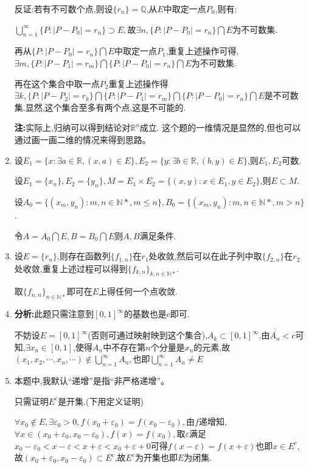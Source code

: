\documentclass[UTF8, a4paper, 12pt, oneside, onecolumn]{article}
\numberwithin{equation}{section}
\numberwithin{figure}{section}
\numberwithin{table}{section}
\theoremstyle{nonumberplain}	%
\theoremstyle{plain}	%
\theoremstyle{plain}	%
\theoremstyle{plain}	%
\theoremstyle{plain}	%
\theoremstyle{nonumberplain}
\begin{document}
\begin{enumerate}
	反证:若有不可数个点,则设$\{r_n\}=\mathbb{Q}$,从$E$中取定一点$P_0$,则有:
	
	$\displaystyle\bigcup_{n=1}^{\infty}\{P:|P-P_0|=r_n\}\supset E,$故$\exists n, \{P:|P-P_0|=r_n\}\bigcap E$为不可数集.
	
	再从$\{P:|P-P_0|=r_n\}\bigcap E$中取定一点$P_1$,重复上述操作可得,$\exists m,\{P:|P-P_1|=r_m\}\bigcap\{P:|P-P_0|=r_n\}\bigcap E$为不可数集.
	
	再在这个集合中取一点$P_2$重复上述操作得$\exists k,\{P:|P-P_2|=r_k\}\bigcap\{P:|P-P_1|=r_m\}\bigcap\{P:|P-P_0|=r_n\}\bigcap E$是不可数集.显然,这个集合至多有两个点,这是不可能的.
	
	\textbf{注:}实际上,归纳可以得到结论对$\mathbb{R}^n$成立. 这个题的一维情况是显然的,但也可以通过画一画二维的情况来得到思路。
	\item %
	设$E_1=\{x:\exists a\in\mathbb{R},(x,a)\in E\},E_2=\{y:\exists b\in\mathbb{R},(b,y)\in E\}$,则$E_1,E_2$可数.
	
	设$E_1=\{x_n\},E_2=\{y_n\},M=E_1\times E_2=\{(x,y):x\in E_1,y\in E_2\} $,则$E\subset M$.
	
	设$A_0=\{(x_m,y_n):m,n\in \mathbb{N*},m\leqslant n\},B_0=\{(x_m,y_n):m,n\in \mathbb{N*},m > n\}$.
	
	令$A=A_0\bigcap E,B=B_0\bigcap E$则$A,B$满足条件.
	\item 设$\displaystyle E=\{r_n\}$,则存在函数列$\displaystyle\{f_{1,n}\}$在$r_1$处收敛,然后可以在此子列中取$\displaystyle\{f_{2,n}\}$在$r_2$处收敛,重复上述过程可以得到$\displaystyle\{f_{k,n}\}_{k,n\in\mathbb{N*}}$.
	
	取$\displaystyle\{f_{n,n}\}_{n\in\mathbb{N*}}$即可在$E$上得任何一个点收敛.
	
	\item \textbf{分析:}此题只需注意到$[0,1]^{\infty}$的基数也是$c$即可.
	
	不妨设$E=[0,1]^{\infty}$(否则可通过映射映到这个集合),$A_k\subset [0,1]^{\infty}$.由$\displaystyle\overline{\overline{A_n}}<c$可知,$\exists x_n\in [0,1]$,$  $使得$A_n$中不存在第$n$个分量是$x_n$的元素,故$\displaystyle(x_1,x_2,\cdots,x_n,\cdots)\notin \bigcup_{n=1}^{\infty}A_n,$也即$\displaystyle\bigcup_{n=1}^{\infty}A_n\neq E$
	
	\item 本题中,我默认“递增”是指“非严格递增”。
	
	只需证明$E^c$是开集.(下用定义证明)
		
	$\forall x_0\notin E,\exists \varepsilon_0>0,f(x_0+\varepsilon_0)=f(x_0-\varepsilon_0),$由$f$递增知,$\forall  x\in(x_0+\varepsilon_0,x_0-\varepsilon_0),f(x)=f(x_0),$取$\varepsilon$满足$x_0-\varepsilon_0<x-\varepsilon<x+\varepsilon<x_0+\varepsilon+0$可得$f(x-\varepsilon)=f(x+\varepsilon)$也即$x\in E^c$,故$(x_0+\varepsilon_0,x_0-\varepsilon_0)\subset E^c$,故$E^c$为开集也即$E$为闭集.
	

\end{enumerate}
\end{document}
